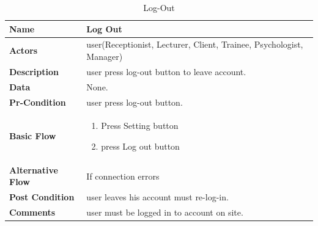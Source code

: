 \documentclass[../Psychological_system_web_application.tex]{subfiles}
\begin{document}
	\begin{center}
		\begin{table}[h!]
			\begin{tabular}{ | m{4cm} | m{10cm}| } 
				\hline
			 	\textbf{\large Name}& Log Out\\ 
				\hline
			  	\textbf{\large Actors}& user(Receptionist, Lecturer, Client, Trainee, Psychologist, Manager)\\ 
				\hline
			  	\textbf{\large Description}& user press log-out button to leave account.\\ 
				\hline
				\textbf{\large Data}& None.\\ 
				\hline
				 \textbf{\large Pr-Condition}& user press log-out button. \\ 
				\hline
				\textbf{\large Basic Flow}&\begin{enumerate}
				\item
					Press Setting button 
				\item
					press Log out button \end{enumerate}\\
					\hline
				\textbf{\large Alternative Flow}& If connection errors\\ 
				\hline
				\textbf{\large Post Condition}& user leaves his account must re-log-in.\\ 
				\hline
				\textbf{\large Comments}& user must be logged in to account on site.\\ 
				\hline
			\end{tabular}
			\caption{Log-Out}
			\label{table:LOG_OUT}
		\end{table}
	\end{center}
	
\end{document}
